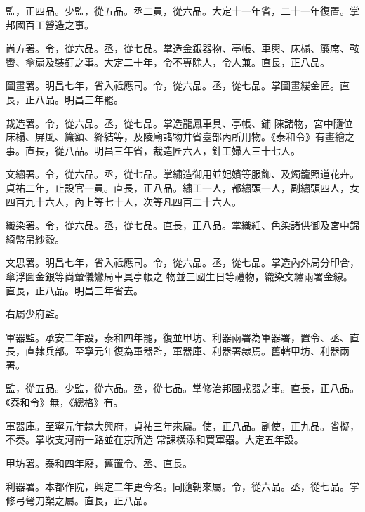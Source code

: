 \begin{pinyinscope}
 監，正四品。少監，從五品。丞二員，從六品。大定十一年省，二十一年復置。掌邦國百工營造之事。



 尚方署。令，從六品。丞，從七品。掌造金銀器物、亭帳、車輿、床榻、簾席、鞍轡、傘扇及裝釘之事。大定二十年，令不專除人，令人兼。直長，正八品。



 圖畫署。明昌七年，省入祗應司。令，從六品。丞，從七品。掌圖畫縷金匠。直長，正八品。明昌三年罷。



 裁造署。令，從六品。丞，從七品。掌造龍鳳車具、亭帳、鋪
 陳諸物，宮中隨位床榻、屏風、簾額、絳結等，及陵廟諸物并省臺部內所用物。《泰和令》有畫繪之事。直長，從八品。明昌三年省，裁造匠六人，針工婦人三十七人。



 文繡署。令，從六品。丞，從七品。掌繡造御用並妃嬪等服飾、及燭籠照道花卉。貞祐二年，止設官一員。直長，正八品。繡工一人，都繡頭一人，副繡頭四人，女四百九十六人，內上等七十人，次等凡四百二十六人。



 織染署。令，從六品。丞，從七品。直長，正八品。掌織紝、色染諸供御及宮中錦綺幣帛紗縠。



 文思署。明昌七年，省入祗應司。令，從六品。丞，從七品。掌造內外局分印合，傘浮圖金銀等尚輦儀鸞局車具亭帳之
 物並三國生日等禮物，織染文繡兩署金線。直長，正八品。明昌三年省去。



 右屬少府監。



 軍器監。承安二年設，泰和四年罷，復並甲坊、利器兩署為軍器署，置令、丞、直長，直隸兵部。至寧元年復為軍器監，軍器庫、利器署隸焉。舊轄甲坊、利器兩署。



 監，從五品。少監，從六品。丞，從七品。掌修治邦國戎器之事。直長，正八品。《泰和令》無，《總格》有。



 軍器庫。至寧元年隸大興府，貞祐三年來屬。使，正八品。副使，正九品。省擬，不奏。掌收支河南一路並在京所造
 常課橫添和買軍器。大定五年設。



 甲坊署。泰和四年廢，舊置令、丞、直長。



 利器署。本都作院，興定二年更今名。同隨朝來屬。令，從六品。丞，從七品。掌修弓弩刀槊之屬。直長，正八品。




\end{pinyinscope}
